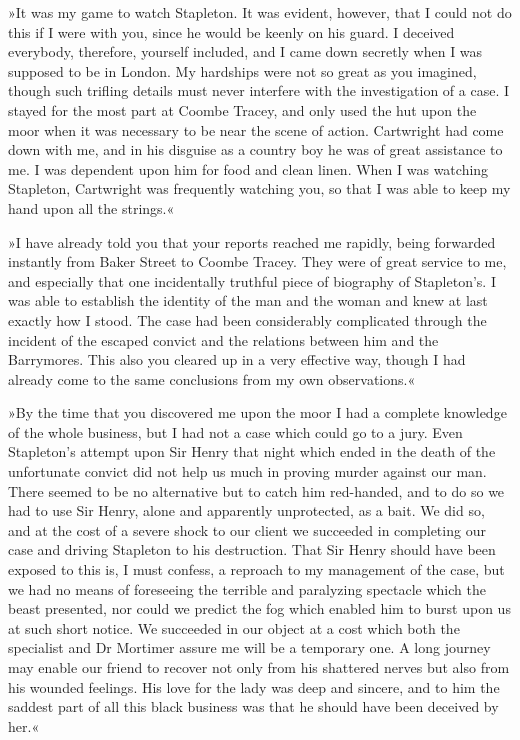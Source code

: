 »It was my game to watch Stapleton. It was evident, however, that I could not do this if I were with you, since he would be keenly on his guard. I deceived everybody, therefore, yourself included, and I came down secretly when I was supposed to be in London. My hardships were not so great as you imagined, though such trifling details must never interfere with the investigation of a case. I stayed for the most part at Coombe Tracey, and only used the hut upon the moor when it was necessary to be near the scene of action. Cartwright had come down with me, and in his disguise as a country boy he was of great assistance to me. I was dependent upon him for food and clean linen. When I was watching Stapleton, Cartwright was frequently watching you, so that I was able to keep my hand upon all the strings.«

»I have already told you that your reports reached me rapidly, being forwarded instantly from Baker Street to Coombe Tracey. They were of great service to me, and especially that one incidentally truthful piece of biography of Stapleton's. I was able to establish the identity of the man and the woman and knew at last exactly how I stood. The case had been considerably complicated through the incident of the escaped convict and the relations between him and the Barrymores. This also you cleared up in a very effective way, though I had already come to the same conclusions from my own observations.«

»By the time that you discovered me upon the moor I had a complete knowledge of the whole business, but I had not a case which could go to a jury. Even Stapleton's attempt upon Sir Henry that night which ended in the death of the unfortunate convict did not help us much in proving murder against our man. There seemed to be no alternative but to catch him red-handed, and to do so we had to use Sir Henry, alone and apparently unprotected, as a bait. We did so, and at the cost of a severe shock to our client we succeeded in completing our case and driving Stapleton to his destruction. That Sir Henry should have been exposed to this is, I must confess, a reproach to my management of the case, but we had no means of foreseeing the terrible and paralyzing spectacle which the beast presented, nor could we predict the fog which enabled him to burst upon us at such short notice. We succeeded in our object at a cost which both the specialist and Dr Mortimer assure me will be a temporary one. A long journey may enable our friend to recover not only from his shattered nerves but also from his wounded feelings. His love for the lady was deep and sincere, and to him the saddest part of all this black business was that he should have been deceived by her.«

